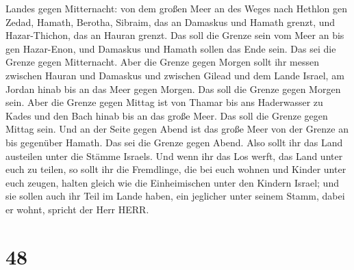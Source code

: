 Landes gegen Mitternacht: von dem großen Meer an des Weges nach Hethlon
gen Zedad,  Hamath, Berotha, Sibraim, das an Damaskus und
Hamath grenzt, und Hazar-Thichon, das an Hauran grenzt. 
Das soll die Grenze sein vom Meer an bis gen Hazar-Enon, und Damaskus
und Hamath sollen das Ende sein. Das sei die Grenze gegen Mitternacht.
 Aber die Grenze gegen Morgen sollt ihr messen zwischen
Hauran und Damaskus und zwischen Gilead und dem Lande Israel, am Jordan
hinab bis an das Meer gegen Morgen. Das soll die Grenze gegen Morgen
sein.  Aber die Grenze gegen Mittag ist von Thamar bis ans
Haderwasser zu Kades und den Bach hinab bis an das große Meer. Das soll
die Grenze gegen Mittag sein.  Und an der Seite gegen Abend
ist das große Meer von der Grenze an bis gegenüber Hamath. Das sei die
Grenze gegen Abend.  Also sollt ihr das Land austeilen
unter die Stämme Israels.  Und wenn ihr das Los werft, das
Land unter euch zu teilen, so sollt ihr die Fremdlinge, die bei euch
wohnen und Kinder unter euch zeugen, halten gleich wie die Einheimischen
unter den Kindern Israel;  und sie sollen auch ihr Teil im
Lande haben, ein jeglicher unter seinem Stamm, dabei er wohnt, spricht
der Herr HERR.

\hypertarget{section-47}{%
\section{48}\label{section-47}}

